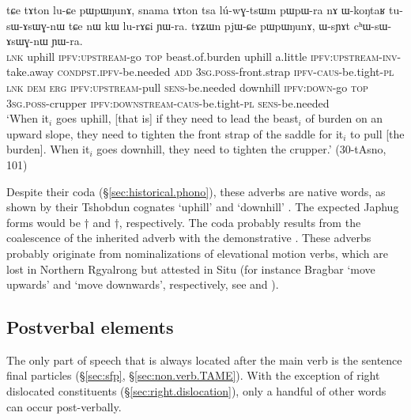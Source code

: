 \begin{exe}
\ex \label{ex:tAton.tAZWn}
\gll tɕe tɤton lu-ɕe pɯpɯŋunɤ, snama tɤton tsa lú-wɣ-tsɯm pɯ\redp{}pɯ-ra nɤ ɯ-koŋtaʁ tu-sɯ-ɤsɯɣ-nɯ tɕe nɯ kɯ lu-rɤɕi ɲɯ-ra.  tɤʑɯn pjɯ-ɕe pɯpɯŋunɤ, ɯ-sɲɤt cʰɯ-sɯ-ɤsɯɣ-nɯ ɲɯ-ra. \\
\textsc{lnk} uphill \textsc{ipfv}:\textsc{upstream}-go \textsc{top} beast.of.burden uphill a.little \textsc{ipfv}:\textsc{upstream}-\textsc{inv}-take.away \textsc{cond}\redp{}\textsc{pst}.\textsc{ipfv}-be.needed \textsc{add} \textsc{3sg}.\textsc{poss}-front.strap \textsc{ipfv}-\textsc{caus}-be.tight-\textsc{pl} \textsc{lnk} \textsc{dem} \textsc{erg} \textsc{ipfv}:\textsc{upstream}-pull \textsc{sens}-be.needed downhill \textsc{ipfv}:\textsc{down}-go \textsc{top} \textsc{3sg}.\textsc{poss}-crupper \textsc{ipfv}:\textsc{downstream}-\textsc{caus}-be.tight-\textsc{pl} \textsc{sens}-be.needed \\
\glt `When it$_i$ goes uphill, [that is] if they need to lead the beast$_i$ of burden on an upward slope, they need to tighten the front strap of the saddle for it$_i$ to pull [the burden]. When it$_i$ goes downhill, they need to tighten the crupper.'  (30-tAsno, 101)
\end{exe}

Despite their  coda (§\ref{sec:historical.phono}), these adverbs are native words, as shown by their Tshobdun cognates  `uphill' and  `downhill' \citep[123--4]{jackson19tshobdun}. The expected Japhug forms would be $\dagger$ and $\dagger$, respectively. The coda  probably results from the coalescence of the inherited adverb with the demonstrative . These adverbs probably originate from nominalizations of elevational motion verbs, which are lost in Northern Rgyalrong but attested in Situ (for instance Bragbar  `move upwards' and
 `move downwards', respectively, see \citealt[§9.1]{zhangshuya20these} and \citealt{linyj17space}).

\subsection{Postverbal elements} \label{sec:postverbal.adv}
The only part of speech that is always located after the main verb is the sentence final particles (§\ref{sec:sfp}, §\ref{sec:non.verb.TAME}). With the exception of right dislocated constituents (§\ref{sec:right.dislocation}), only a handful of other words can occur post-verbally.

